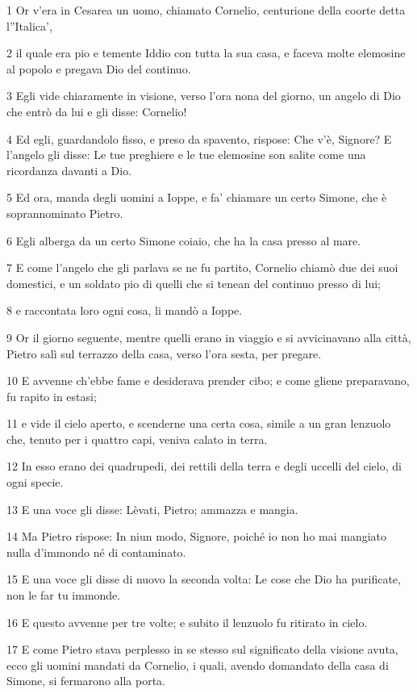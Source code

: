 \par 1 Or v'era in Cesarea un uomo, chiamato Cornelio, centurione della coorte detta l''Italica',
\par 2 il quale era pio e temente Iddio con tutta la sua casa, e faceva molte elemosine al popolo e pregava Dio del continuo.
\par 3 Egli vide chiaramente in visione, verso l'ora nona del giorno, un angelo di Dio che entrò da lui e gli disse: Cornelio!
\par 4 Ed egli, guardandolo fisso, e preso da spavento, rispose: Che v'è, Signore? E l'angelo gli disse: Le tue preghiere e le tue elemosine son salite come una ricordanza davanti a Dio.
\par 5 Ed ora, manda degli uomini a Ioppe, e fa' chiamare un certo Simone, che è soprannominato Pietro.
\par 6 Egli alberga da un certo Simone coiaio, che ha la casa presso al mare.
\par 7 E come l'angelo che gli parlava se ne fu partito, Cornelio chiamò due dei suoi domestici, e un soldato pio di quelli che si tenean del continuo presso di lui;
\par 8 e raccontata loro ogni cosa, li mandò a Ioppe.
\par 9 Or il giorno seguente, mentre quelli erano in viaggio e si avvicinavano alla città, Pietro salì sul terrazzo della casa, verso l'ora sesta, per pregare.
\par 10 E avvenne ch'ebbe fame e desiderava prender cibo; e come gliene preparavano, fu rapito in estasi;
\par 11 e vide il cielo aperto, e scenderne una certa cosa, simile a un gran lenzuolo che, tenuto per i quattro capi, veniva calato in terra.
\par 12 In esso erano dei quadrupedi, dei rettili della terra e degli uccelli del cielo, di ogni specie.
\par 13 E una voce gli disse: Lèvati, Pietro; ammazza e mangia.
\par 14 Ma Pietro rispose: In niun modo, Signore, poiché io non ho mai mangiato nulla d'immondo né di contaminato.
\par 15 E una voce gli disse di nuovo la seconda volta: Le cose che Dio ha purificate, non le far tu immonde.
\par 16 E questo avvenne per tre volte; e subito il lenzuolo fu ritirato in cielo.
\par 17 E come Pietro stava perplesso in se stesso sul significato della visione avuta, ecco gli uomini mandati da Cornelio, i quali, avendo domandato della casa di Simone, si fermarono alla porta.
